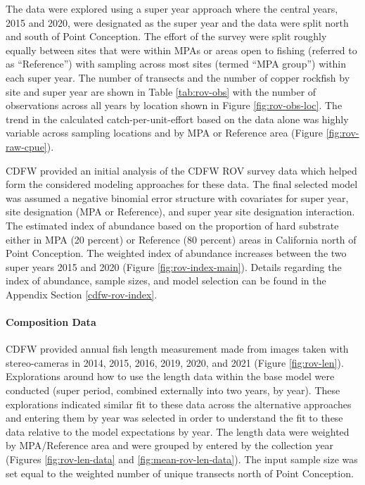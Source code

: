 \documentclass[11pt,
  english,
  letterpaper,
]{article}
\begin{document}
The data were explored using a super year approach where the central years, 2015 and 2020, were designated as the super year and the data were split north and south of Point Conception. The effort of the survey were split roughly equally between sites that were within MPAs or areas open to fishing (referred to as ``Reference'') with sampling across most sites (termed ``MPA group'') within each super year. The number of transects and the number of copper rockfish by site and super year are shown in Table \ref{tab:rov-obs} with the number of observations across all years by location shown in Figure \ref{fig:rov-obs-loc}. The trend in the calculated catch-per-unit-effort based on the data alone was highly variable across sampling locations and by MPA or Reference area (Figure \ref{fig:rov-raw-cpue}).

CDFW provided an initial analysis of the CDFW ROV survey data which helped form the considered modeling approaches for these data. The final selected model was assumed a negative binomial error structure with covariates for super year, site designation (MPA or Reference), and super year site designation interaction. The estimated index of abundance based on the proportion of hard substrate either in MPA (20 percent) or Reference (80 percent) areas in California north of Point Conception. The weighted index of abundance increases between the two super years 2015 and 2020 (Figure \ref{fig:rov-index-main}). Details regarding the index of abundance, sample sizes, and model selection can be found in the Appendix Section \ref{cdfw-rov-index}.

\hypertarget{composition-data-3}{%
\paragraph{Composition Data}\label{composition-data-3}}

\hfill\break

CDFW provided annual fish length measurement made from images taken with stereo-cameras in 2014, 2015, 2016, 2019, 2020, and 2021 (Figure \ref{fig:rov-len}). Explorations around how to use the length data within the base model were conducted (super period, combined externally into two years, by year). These explorations indicated similar fit to these data across the alternative approaches and entering them by year was selected in order to understand the fit to these data relative to the model expectations by year. The length data were weighted by MPA/Reference area and were grouped by entered by the collection year (Figures \ref{fig:rov-len-data} and \ref{fig:mean-rov-len-data}). The input sample size was set equal to the weighted number of unique transects north of Point Conception.
\end{document}
